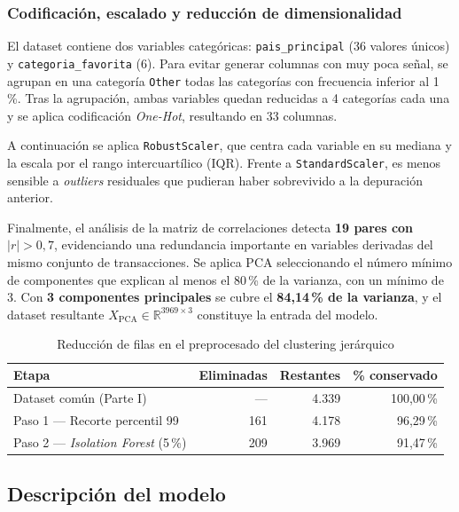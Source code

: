\documentclass[11pt,a4paper]{article}
\begin{document}
\subsubsection{Codificación, escalado y reducción de dimensionalidad}

El dataset contiene dos variables categóricas: \texttt{pais\_principal} (36 valores únicos) y \texttt{categoria\_favorita} (6). Para evitar generar columnas con muy poca señal, se agrupan en una categoría \texttt{Other} todas las categorías con frecuencia inferior al 1\,\%. Tras la agrupación, ambas variables quedan reducidas a 4 categorías cada una y se aplica codificación \textit{One-Hot}, resultando en 33 columnas.

A continuación se aplica \texttt{RobustScaler}, que centra cada variable en su mediana y la escala por el rango intercuartílico (IQR). Frente a \texttt{StandardScaler}, es menos sensible a \textit{outliers} residuales que pudieran haber sobrevivido a la depuración anterior.

Finalmente, el análisis de la matriz de correlaciones detecta \textbf{19 pares con $|r| > 0,7$}, evidenciando una redundancia importante en variables derivadas del mismo conjunto de transacciones. Se aplica PCA seleccionando el número mínimo de componentes que explican al menos el 80\,\% de la varianza, con un mínimo de 3. Con \textbf{3 componentes principales} se cubre el \textbf{84,14\,\% de la varianza}, y el dataset resultante $X_{\text{PCA}} \in \mathbb{R}^{3969 \times 3}$ constituye la entrada del modelo.

\begin{table}[h]
\centering
\caption{Reducción de filas en el preprocesado del clustering jerárquico}
\label{tab:reduccion}
\begin{tabular}{lrrr}
\toprule
\textbf{Etapa} & \textbf{Eliminadas} & \textbf{Restantes} & \textbf{\% conservado} \\
\midrule
Dataset común (Parte I) & --- & 4.339 & 100,00\,\% \\
Paso 1 — Recorte percentil 99 & 161 & 4.178 & 96,29\,\% \\
Paso 2 — \textit{Isolation Forest} (5\,\%) & 209 & 3.969 & 91,47\,\% \\
\bottomrule
\end{tabular}
\end{table}

\subsection{Descripción del modelo}
\end{document}
